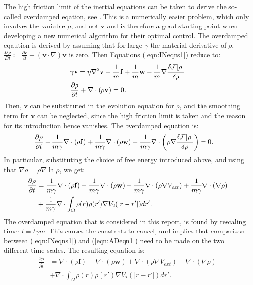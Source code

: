 \documentclass[11pt, a4paper]{article}
\theoremstyle{definition}
\newcommand{\Sta}{\rho}
\newcommand{\Stav}{\mathbf{v}}
\newcommand{\Con}{\mathbf{f}}
\begin{document}
The high friction limit of the inertial equations can be taken to derive the so-called overdamped eqation, see \cite{Archer1}. This is a numerically easier problem, which only involves the variable $\rho$, and not $\Stav$ and is therefore a good starting point when developing a new numerical algorithm for their optimal control. 
The overdamped eqaution is derived by assuming that for large $\gamma$ the material derivative of $\Sta$, $\frac{D \Sta}{D t} \coloneqq  \frac{\partial \Stav}{\partial t} + (\Stav \cdot \nabla)\Stav$ is zero.
Then Equations (\ref{eqn:INeqns1}) reduce to:
 \begin{align*}
&\gamma \Stav=\eta \nabla^2 \Stav  -\frac{1}{m}\Con +\frac{1}{m}\mathbf{w} - \frac{1}{m}\nabla \frac{\delta \mathcal{F}[\Sta]}{\delta \Sta}\\
 &\frac{\partial \Sta}{\partial t} + \nabla \cdot (\Sta \Stav)=0 \notag.
 \end{align*}
Then, $\Stav$ can be substituted in the evolution equation for $\rho$, and the smoothing term for $\Stav$ can be neglected, since the high friction limit is taken and the reason for its introduction hence vanishes. The overdamped equation is:
  \begin{align*}
 &\frac{\partial \Sta}{\partial t} -\frac{1}{m \gamma}\nabla \cdot (\Sta\Con) +\frac{1}{m \gamma} \nabla \cdot (\Sta \mathbf{w}) - \frac{1}{m \gamma}\nabla \cdot \bigg(\Sta\nabla \frac{\delta \mathcal{F}[\Sta]}{\delta \Sta}\bigg)=0 \notag.
 \end{align*}
 In particular, substituting the choice of free energy introduced above, and using that $\nabla \rho = \rho\nabla \ln \rho$, we get:
\begin{align*}
\frac{\partial \Sta}{\partial t} &= \frac{1}{m \gamma}\nabla \cdot (\Sta\Con) -\frac{1}{m \gamma} \nabla \cdot (\Sta \mathbf{w})  + \frac{1}{m \gamma}\nabla \cdot (\rho\nabla V_{ext}) + \frac{1}{m \gamma}\nabla \cdot (\nabla \rho) \\
&+\frac{1}{m \gamma}\nabla \cdot \int_\Omega \Sta(r)\Sta(r') \nabla V_2(|r-r'|)dr'\notag.
\end{align*}
The overdamped equation that is considered in this report, is found by rescaling time: $t = \tilde t \gamma m$. This causes the constants to cancel, and implies that comparison between (\ref{eqn:INeqns1}) and (\ref{eqn:ADeqn1}) need to be made on the two different time scales.
The resulting equation is:
\begin{align*}
\label{eqn:ADeqn1}
\frac{\partial \Sta}{\partial \tilde t} &= \nabla \cdot (\Sta\Con) - \nabla \cdot (\Sta \mathbf{w})  + \nabla \cdot (\rho\nabla V_{ext}) + \nabla \cdot (\nabla \rho) \\
&+\nabla \cdot \int_\Omega \Sta(r)\Sta(r') \nabla V_2(|r-r'|)dr'.
\end{align*}
\end{document}
